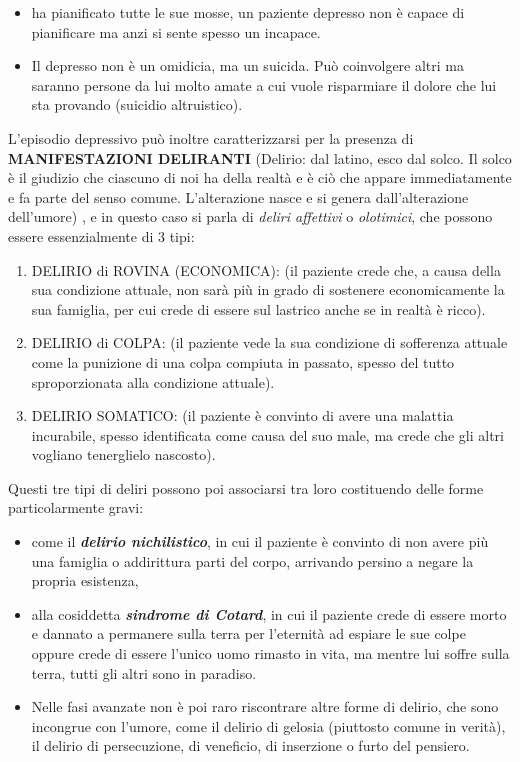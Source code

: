 \documentclass[]{article}
\begin{document}
\begin{itemize}
\item
  ha pianificato tutte le sue mosse, un paziente depresso non è capace
  di pianificare ma anzi si sente spesso un incapace.
\item
  Il depresso non è un omidicia, ma un suicida. Può coinvolgere altri ma
  saranno persone da lui molto amate a cui vuole risparmiare il dolore
  che lui sta provando (suicidio altruistico).
\end{itemize}

L'episodio depressivo può inoltre caratterizzarsi per la presenza di
\textbf{MANIFESTAZIONI DELIRANTI} (Delirio: dal latino, esco dal solco.
Il solco è il giudizio che ciascuno di noi ha della realtà e è ciò che
appare immediatamente e fa parte del senso comune. L'alterazione nasce e
si genera dall'alterazione dell'umore) , e in questo caso si parla di
\emph{deliri affettivi} o \emph{olotimici}, che possono essere
essenzialmente di 3 tipi:

\begin{enumerate}
\def\labelenumi{\arabic{enumi}.}
\item
  DELIRIO di ROVINA (ECONOMICA): (il paziente crede che, a causa della
  sua condizione attuale, non sarà più in grado di sostenere
  economicamente la sua famiglia, per cui crede di essere sul lastrico
  anche se in realtà è ricco).
\item
  DELIRIO di COLPA: (il paziente vede la sua condizione di sofferenza
  attuale come la punizione di una colpa compiuta in passato, spesso del
  tutto sproporzionata alla condizione attuale).
\item
  DELIRIO SOMATICO: (il paziente è convinto di avere una malattia
  incurabile, spesso identificata come causa del suo male, ma crede che
  gli altri vogliano tenerglielo nascosto).
\end{enumerate}

Questi tre tipi di deliri possono poi associarsi tra loro costituendo
delle forme particolarmente gravi:

\begin{itemize}
\item
  come il \textbf{\emph{delirio nichilistico}}, in cui il paziente è
  convinto di non avere più una famiglia o addirittura parti del corpo,
  arrivando persino a negare la propria esistenza,
\item
  alla cosiddetta \textbf{\emph{sindrome di Cotard}}, in cui il paziente
  crede di essere morto e dannato a permanere sulla terra per l'eternità
  ad espiare le sue colpe oppure crede di essere l'unico uomo rimasto in
  vita, ma mentre lui soffre sulla terra, tutti gli altri sono in
  paradiso.
\item
  Nelle fasi avanzate non è poi raro riscontrare altre forme di delirio,
  che sono incongrue con l'umore, come il delirio di gelosia (piuttosto
  comune in verità), il delirio di persecuzione, di veneficio, di
  inserzione o furto del pensiero.
\end{itemize}
\end{document}
